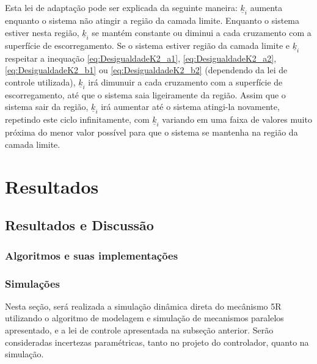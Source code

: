 \documentclass[]{politex}
\begin{document}
Esta lei de adaptação pode ser explicada da seguinte maneira: $\underline{k}_i$ aumenta enquanto o sistema não atingir a região da camada limite. Enquanto o sistema estiver nesta região, $\underline{k}_i$ se mantém constante ou diminui a cada cruzamento com a superfície de escorregamento. Se o sistema estiver região da camada limite e $\underline{k}_i$ respeitar a inequação \eqref{eq:DesigualdadeK2_a1}, \eqref{eq:DesigualdadeK2_a2}, \eqref{eq:DesigualdadeK2_b1} ou \eqref{eq:DesigualdadeK2_b2} (dependendo da lei de controle utilizada), $\underline{k}_i$ irá dimunuir a cada cruzamento com a superfície de escorregamento, até que o sistema saia ligeiramente da região. Assim que o sistema sair da região, $\underline{k}_i$ irá aumentar até o sistema atingi-la novamente, repetindo este ciclo infinitamente, com $\underline{k}_i$ variando em uma faixa de valores muito próxima do menor valor possível para que o sistema se mantenha na região da camada limite.

\part{Resultados}

\chapter{Resultados e Discussão}

\section{Algoritmos e suas implementações}

\section{Simulações}

Nesta seção, será realizada a simulação dinâmica direta do mecânismo 5R utilizando o algoritmo de modelagem e simulação de mecanismos paralelos apresentado, e a lei de controle apresentada na subseção anterior. Serão consideradas incertezas paramétricas, tanto no projeto do controlador, quanto na simulação.
\end{document}
